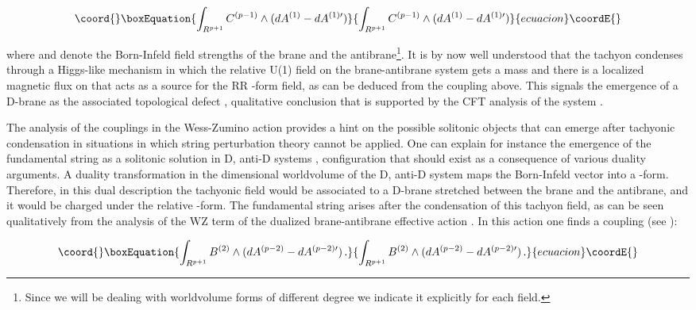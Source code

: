 \documentclass[12pt,a4paper]{article}
\begin{document}
\begin{equation}\coord{}\boxEquation{
\int_{R^{p+1}}C^{(p-1)}\wedge (dA^{(1)}-dA^{(1)\prime})
}{
\int_{R^{p+1}}C^{(p-1)}\wedge (dA^{(1)}-dA^{(1)\prime})
}{ecuacion}\coordE{}\end{equation}

\noindent where \coordHE{} and \coordHE{} denote the 
Born-Infeld field strengths of the brane and the 
antibrane\footnote{Since we will be dealing with worldvolume
forms of different degree we indicate it explicitly for each
field.}. 
It is by now well understood that the tachyon condenses through
a Higgs-like mechanism in which the relative
U(1) field on the brane-antibrane system gets a mass 
and there is a localized magnetic
flux on \coordHE{} that acts as a
source for the RR \coordHE{}-form field, 
as can be deduced from
the coupling above. This signals the emergence of a D\coordHE{}-brane
as the associated topological defect \cite{Sen1}, 
qualitative conclusion that is supported 
by the CFT analysis of the system \cite{Sen2,MS}.

The analysis of the
couplings in the Wess-Zumino action   
provides a hint on the possible solitonic objects
that can emerge after tachyonic condensation 
in situations in which string perturbation theory 
cannot be applied.
One can explain for instance the emergence of the
fundamental string as a solitonic solution in D\coordHE{}, anti-D\coordHE{}
systems \cite{Yi,HL1}, configuration that should exist as a
consequence of various duality arguments. A duality transformation
in the \coordHE{} dimensional worldvolume of the D\coordHE{}, anti-D\coordHE{} system
maps the Born-Infeld vector into a \coordHE{}-form. Therefore, in
this dual description the tachyonic field would be associated to
a D\coordHE{}-brane stretched between the brane and the antibrane, and
it would be charged under the relative \coordHE{}-form.
The fundamental string arises after the condensation of this tachyon
field, as can be seen 
qualitatively from the
analysis of the WZ term of the dualized brane-antibrane
effective action \cite{Yi,HL1}. In this action one finds a 
coupling (see \cite{HL1}):

\begin{equation}\coord{}\boxEquation{
\int_{R^{p+1}}B^{(2)}\wedge (dA^{(p-2)}-dA^{(p-2)\prime})\, .
}{
\int_{R^{p+1}}B^{(2)}\wedge (dA^{(p-2)}-dA^{(p-2)\prime})\, .
}{ecuacion}\coordE{}\end{equation}
\end{document}
